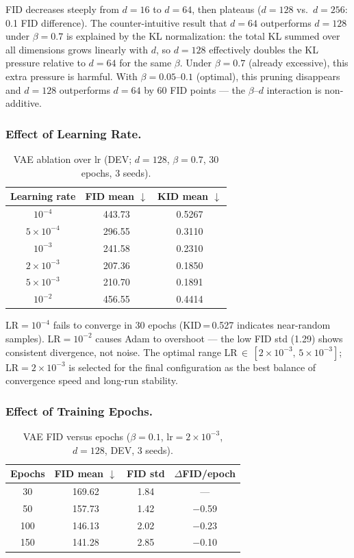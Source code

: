 \documentclass[runningheads]{llncs}
\begin{document}
FID decreases steeply from $d=16$ to $d=64$, then plateaus ($d=128$ vs.\ $d=256$: 0.1 FID difference). The counter-intuitive result that $d=64$ outperforms $d=128$ under $\beta=0.7$ is explained by the KL normalization: the total KL summed over all dimensions grows linearly with $d$, so $d=128$ effectively doubles the KL pressure relative to $d=64$ for the same $\beta$. Under $\beta=0.7$ (already excessive), this extra pressure is harmful. With $\beta=0.05$--$0.1$ (optimal), this pruning disappears and $d=128$ outperforms $d=64$ by 60 FID points — the $\beta$--$d$ interaction is non-additive.

\subsubsection{Effect of Learning Rate.}

\begin{table}[htbp]
\caption{VAE ablation over lr (DEV; $d=128$, $\beta=0.7$, 30 epochs, 3 seeds).}\label{tab:vae_lr}
\centering
\begin{tabular}{ccc}
\toprule
Learning rate & FID mean $\downarrow$ & KID mean $\downarrow$ \\
\midrule
$10^{-4}$          & 443.73 & 0.5267 \\
$5{\times}10^{-4}$ & 296.55 & 0.3110 \\
$10^{-3}$          & 241.58 & 0.2310 \\
$2{\times}10^{-3}$ & 207.36 & 0.1850 \\
$5{\times}10^{-3}$ & 210.70 & 0.1891 \\
$10^{-2}$          & 456.55 & 0.4414 \\
\bottomrule
\end{tabular}
\end{table}

LR$=10^{-4}$ fails to converge in 30 epochs (KID\,=\,0.527 indicates near-random samples). LR$=10^{-2}$ causes Adam to overshoot — the low FID std (1.29) shows consistent divergence, not noise. The optimal range LR\,$\in\,[2{\times}10^{-3},\,5{\times}10^{-3}]$; LR$=2{\times}10^{-3}$ is selected for the final configuration as the best balance of convergence speed and long-run stability.

\subsubsection{Effect of Training Epochs.}

\begin{table}[htbp]
\caption{VAE FID versus epochs ($\beta=0.1$, lr$=2{\times}10^{-3}$, $d=128$, DEV, 3 seeds).}\label{tab:vae_epochs}
\centering
\begin{tabular}{cccc}
\toprule
Epochs & FID mean $\downarrow$ & FID std & $\Delta$FID/epoch \\
\midrule
30  & 169.62 & 1.84 & — \\
50  & 157.73 & 1.42 & $-$0.59 \\
100 & 146.13 & 2.02 & $-$0.23 \\
150 & 141.28 & 2.85 & $-$0.10 \\
\bottomrule
\end{tabular}
\end{table}
\end{document}
